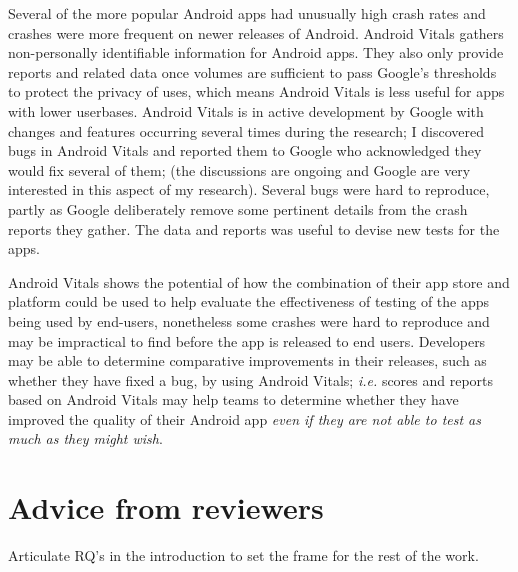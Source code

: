 \begin{SingleSpace}
Several of the more popular Android apps had unusually high crash rates and crashes were more frequent on newer releases of Android. %
Android Vitals gathers non-personally identifiable information for Android apps. They also only provide reports and related data once volumes are sufficient to pass Google's thresholds to protect the privacy of uses, which means Android Vitals is less useful for apps with lower userbases. %
Android Vitals is in active development by Google with changes and features occurring several times during the research; I discovered bugs in Android Vitals and reported them to Google who acknowledged they would fix several of them; (the discussions are ongoing and Google are very interested in this aspect of my research).
Several bugs were hard to reproduce, partly as Google deliberately remove some pertinent details from the crash reports they gather. The data and reports was useful to devise new tests for the apps.

Android Vitals shows the potential of how the combination of their app store and platform could be used to help evaluate the effectiveness of testing of the apps being used by end-users, nonetheless some crashes were hard to reproduce and may be impractical to find before the app is released to end users. Developers may be able to determine comparative improvements in their releases, such as whether they have fixed a bug, by using Android Vitals; \textit{i.e.} scores and reports based on Android Vitals may help teams to determine whether they have improved the quality of their Android app \textit{even if they are not able to test as much as they might wish}.
\end{SingleSpace}
\newpage

\section{Advice from reviewers}


Articulate RQ's in the introduction to set the frame for the rest of the work.

